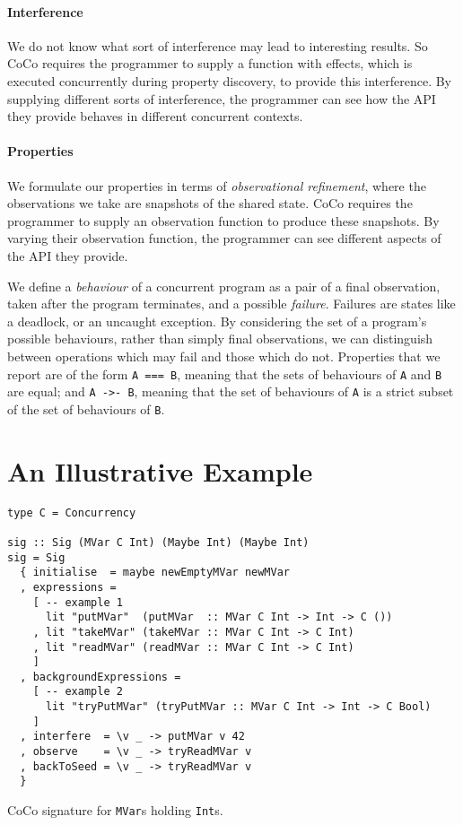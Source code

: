 \paragraph{Interference}
We do not know what sort of interference may lead to interesting
results.  So CoCo requires the programmer to supply a function with
effects, which is executed concurrently during property discovery, to
provide this interference.  By supplying different sorts of
interference, the programmer can see how the API they provide behaves
in different concurrent contexts.

\paragraph{Properties}
We formulate our properties in terms of \emph{observational
  refinement}\cite{he1986}, where the observations we take are
snapshots of the shared state.  CoCo requires the programmer to supply
an observation function to produce these snapshots.  By varying their
observation function, the programmer can see different aspects of the
API they provide.

We define a \emph{behaviour} of a concurrent program as a pair of a
final observation, taken after the program terminates, and a possible
\emph{failure}.  Failures are states like a deadlock, or an uncaught
exception.  By considering the set of a program's possible behaviours,
rather than simply final observations, we can distinguish between
operations which may fail and those which do not.  Properties that we
report are of the form \verb|A === B|, meaning that the sets of
behaviours of \verb|A| and \verb|B| are equal; and \verb|A ->- B|,
meaning that the set of behaviours of \verb|A| is a strict subset of
the set of behaviours of \verb|B|.

\section{An Illustrative Example}
\label{sec:coco-example}

\begin{listing}
\begin{verbatim}
type C = Concurrency

sig :: Sig (MVar C Int) (Maybe Int) (Maybe Int)
sig = Sig
  { initialise  = maybe newEmptyMVar newMVar
  , expressions =
    [ -- example 1
      lit "putMVar"  (putMVar  :: MVar C Int -> Int -> C ())
    , lit "takeMVar" (takeMVar :: MVar C Int -> C Int)
    , lit "readMVar" (readMVar :: MVar C Int -> C Int)
    ]
  , backgroundExpressions =
    [ -- example 2
      lit "tryPutMVar" (tryPutMVar :: MVar C Int -> Int -> C Bool)
    ]
  , interfere  = \v _ -> putMVar v 42
  , observe    = \v _ -> tryReadMVar v
  , backToSeed = \v _ -> tryReadMVar v
  }
\end{verbatim}
\caption{CoCo signature for \texttt{MVar}s holding \texttt{Int}s.}
\label{lst:mvar}
\end{listing}

